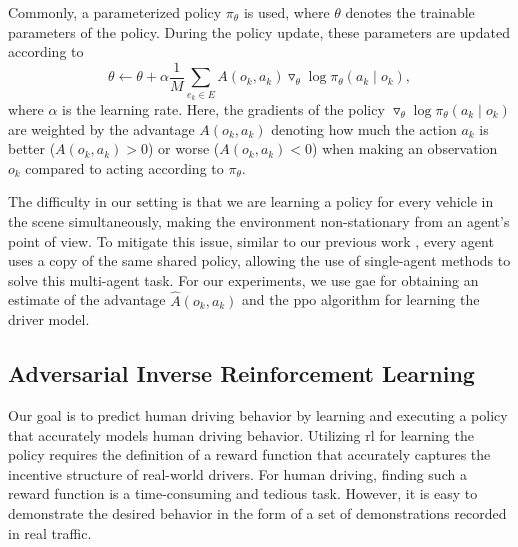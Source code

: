 \documentclass[a4paper,12pt,onecolumn]{article}
\begin{document}
Commonly, a parameterized policy $\pi_\theta$ is used, where $\theta$ denotes the trainable parameters of the policy. During the policy update, these parameters are updated according to
\begin{equation}
    \theta \leftarrow \theta + \alpha \frac{1}{M} \sum_{e_k \in E} A(o_k, a_k) \triangledown_\theta \log \pi_\theta (a_k \mid o_k),
\end{equation}
where $\alpha$ is the learning rate. Here, the gradients of the policy $\triangledown_\theta \log \pi_\theta(a_k \mid o_k)$ are weighted by the advantage $A(o_k, a_k)$ denoting how much the action $a_k$ is better ($A(o_k, a_k) > 0$) or worse ($A(o_k, a_k) < 0$) when making an observation $o_k$ compared to acting according to $\pi_\theta$.

The difficulty in our setting is that we are learning a policy for every vehicle in the scene simultaneously, making the environment non-stationary from an agent's point of view. To mitigate this issue, similar to our previous work \cite{Konstantinidis23}, every agent uses a copy of the same shared policy, allowing the use of single-agent methods to solve this multi-agent task. 
For our experiments, we use \gls{gae} \cite{Schulmann15} for obtaining an estimate of the advantage $\hat{A}(o_k, a_k)$ and the \gls{ppo} \cite{Schulmann17} algorithm for learning the driver model.

\subsection{Adversarial Inverse Reinforcement Learning}
Our goal is to predict human driving behavior by learning and executing a policy that accurately models human driving behavior.
Utilizing \gls{rl} for learning the policy requires the definition of a reward function that accurately captures the incentive structure of real-world drivers. For human driving, finding such a reward function is a time-consuming and tedious task. However, it is easy to demonstrate the desired behavior in the form of a set of demonstrations recorded in real traffic. 
\end{document}
